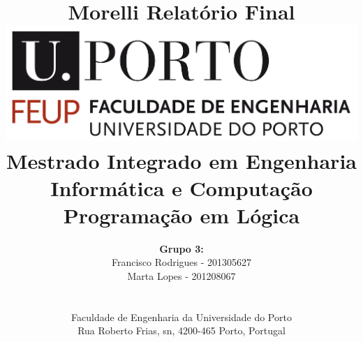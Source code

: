 \documentclass[a4paper]{article}
\begin{document}
\setlength{\textwidth}{16cm}
\setlength{\textheight}{22cm}

\title{\Huge\textbf{Morelli}\linebreak\linebreak\linebreak
\Large\textbf{Relatório Final}\linebreak\linebreak
\linebreak\linebreak
\includegraphics[scale=0.1]{feup-logo.png}\linebreak\linebreak
\linebreak\linebreak
\Large{Mestrado Integrado em Engenharia Informática e Computação} \linebreak\linebreak
\Large{Programação em Lógica}\linebreak
}

\author{\textbf{Grupo 3:}\\ Francisco Rodrigues - 201305627 \\ Marta Lopes - 201208067 \\\linebreak\linebreak \\
 \\ Faculdade de Engenharia da Universidade do Porto \\ Rua Roberto Frias, s\/n, 4200-465 Porto, Portugal \linebreak\linebreak\linebreak
\linebreak\linebreak\vspace{1cm}}
\maketitle
\thispagestyle{empty}
\end{document}
